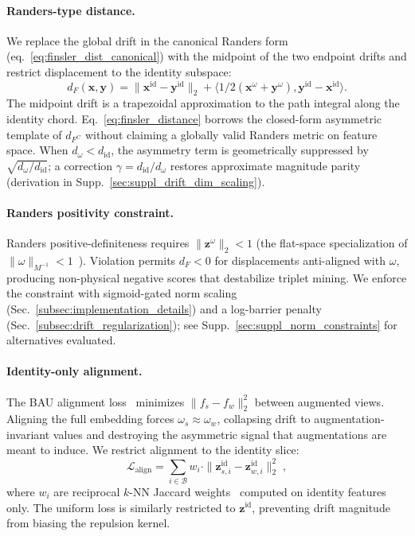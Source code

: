 \paragraph{Randers-type distance.}
We replace the global drift in the canonical Randers form (eq.~\ref{eq:finsler_dist_canonical}) with the midpoint of the two endpoint drifts and restrict displacement to the identity subspace:
\begin{equation}
    d_F(\mathbf{x}, \mathbf{y}) = \|\mathbf{x}^{\mathrm{id}} - \mathbf{y}^{\mathrm{id}}\|_2 + \big\langle 1/2(\mathbf{x}^\omega + \mathbf{y}^\omega), \mathbf{y}^{\mathrm{id}} - \mathbf{x}^{\mathrm{id}} \big\rangle.
    \label{eq:finsler_distance}
\end{equation}
The midpoint drift is a trapezoidal approximation to the path integral along the identity chord. Eq.~\eqref{eq:finsler_distance} borrows the closed-form asymmetric template of $d_{F^C}$ without claiming a globally valid Randers metric on feature space. When $d_\omega < d_{\mathrm{id}}$, the asymmetry term is geometrically suppressed by $\sqrt{d_\omega/d_{\mathrm{id}}}$; a correction $\gamma = d_{\mathrm{id}}/d_\omega$ restores approximate magnitude parity (derivation in Supp.~\ref{sec:suppl_drift_dim_scaling}).

\paragraph{Randers positivity constraint.}
Randers positive-definiteness requires $\|\mathbf{z}^{\omega}\|_2 < 1$ (the flat-space specialization of $\|\omega\|_{M^{-1}}<1$~\cite{bao2000introduction}). Violation permits $d_F < 0$ for displacements anti-aligned with $\omega$, producing non-physical negative scores that destabilize triplet mining. We enforce the constraint with sigmoid-gated norm scaling (Sec.~\ref{subsec:implementation_details}) and a log-barrier penalty (Sec.~\ref{subsec:drift_regularization}); see Supp.~\ref{sec:suppl_norm_constraints} for alternatives evaluated.

\paragraph{Identity-only alignment.} The BAU alignment loss~\cite{cho2024generalizable} minimizes $\|f_s - f_w\|_2^2$ between augmented views. Aligning the full embedding forces $\omega_s\approx\omega_w$, collapsing drift to augmentation-invariant values and destroying the asymmetric signal that augmentations are meant to induce. We restrict alignment to the identity slice:
\begin{equation}
    \mathcal{L}_{\mathrm{align}} = \sum_{i \in \mathcal{B}} w_i \cdot \|\mathbf{z}^{\mathrm{id}}_{s,i} - \mathbf{z}^{\mathrm{id}}_{w,i}\|_2^2 \;,
    \label{eq:identity_only_alignment}
\end{equation}
where $w_i$ are reciprocal $k$-NN Jaccard weights~\cite{zhong2017re,cho2024generalizable} computed on identity features only. The uniform loss is similarly restricted to $\mathbf{z}^{\mathrm{id}}$, preventing drift magnitude from biasing the repulsion kernel.

